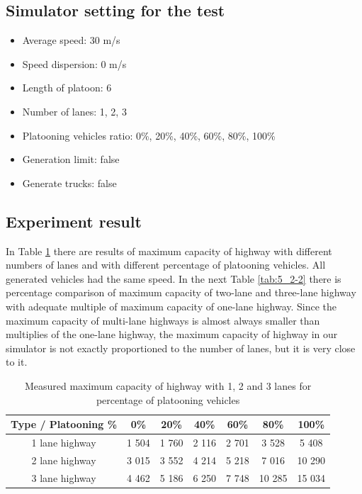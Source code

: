 \subsection*{Simulator setting for the test}
\begin{itemize}
\item Average speed: 30 m/s
\item Speed dispersion: 0 m/s
\item Length of platoon: 6
\item Number of lanes:  1, 2, 3
\item Platooning vehicles ratio: 0\%, 20\%, 40\%, 60\%, 80\%, 100\%
\item Generation limit: false
\item Generate trucks: false
\end{itemize}



\subsection*{Experiment result}

In Table \ref{tab:5_2-1} there are results of maximum capacity of highway with different numbers of lanes and with different percentage of platooning vehicles. All generated vehicles had the same speed. In the next Table \ref{tab:5_2-2} there is percentage comparison of maximum capacity of two-lane and three-lane highway with adequate multiple of maximum capacity of one-lane highway. Since the maximum capacity of multi-lane highways is almost always smaller than multiplies of the one-lane highway, the maximum capacity of highway in our simulator is not exactly proportioned to the number of lanes, but it is very close to it.

\begin{table}[ht]
\begin{centering}
\begin{tabular}{|c|c|c|c|c|c|c|}
\hline 
Type / Platooning \% &	0\% &	20\% &	40\% &	60\% &	80\% &	100\%\tabularnewline
\hline 
1 lane highway &	1 504 &	1 760 &	2 116 &	2 701 &	3 528 &	5 408\tabularnewline
\hline 
2 lane highway &	3 015 &	3 552 &	4 214 &	5 218 &	7 016 &	10 290\tabularnewline
\hline 
3 lane highway &	4 462 &	5 186 &	6 250 &	7 748 &	10 285 &	15 034\tabularnewline
\hline 
\end{tabular}
\centering
\protect\caption{\label{tab:5_2-1}Measured maximum capacity of highway with 1, 2 and 3 lanes for percentage of platooning vehicles}
\end{centering}
\end{table}

